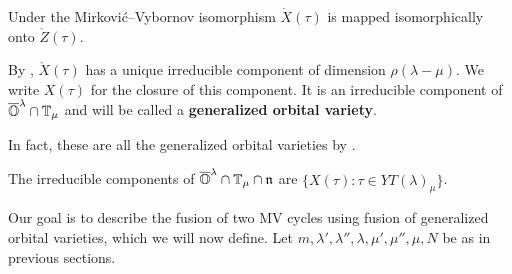 \documentclass{article} %
\begin{document}
\begin{lemma}
    \label{lem:XtZt}
    Under the Mirkovi\'c--Vybornov isomorphism $\mathring X(\tau)$ is mapped isomorphically onto $\mathring Z(\tau)$. 
\end{lemma}

By \cite{dthesis}, $ \mathring X(\tau) $ has a unique irreducible component of dimension $ \rho(\lambda - \mu)$.  We write $ X(\tau)$ for the closure of this component.  It is an irreducible component of $ \overline{\mathbb O}^\lambda \cap \mathbb T_\mu$ and will be called a \textbf{generalized orbital variety}.



In fact, these are all the generalized orbital varieties by  \cite{dthesis}. 
\begin{theorem}
    \label{pr:govsasirrecs}
    The irreducible components of $\overline{\mathbb O}^\lambda\cap\mathbb T_\mu\cap\mathfrak n$ are $\{{X(\tau)} : \tau\in YT(\lambda)_\mu\}$. 
\end{theorem}
% 

% 
Our goal is to describe the fusion of two MV cycles using fusion of generalized orbital varieties, which we will now define. 
% 
Let $m,\lambda',\lambda'',\lambda,\mu',\mu'',\mu,N$ be as in previous sections.
\end{document}
